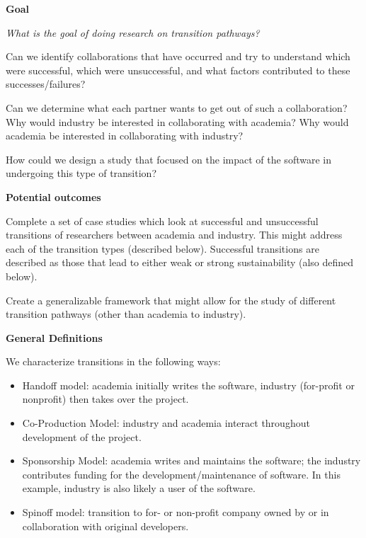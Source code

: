 
\textbf{Goal}

\emph{What is the goal of doing research on transition pathways?} 

Can we identify collaborations that have occurred and try to understand which were successful, which were unsuccessful, and what factors contributed to these successes/failures? 

Can we determine what each partner wants to get out of such a collaboration?
Why would industry be interested in collaborating with academia? 
Why would academia be interested in collaborating with industry?

How could we design a study that focused on the impact of the software in
undergoing this type of transition?

\textbf{Potential outcomes}

Complete a set of case studies which look at successful and unsuccessful
transitions of researchers between academia and industry. This might address 
each of the transition types (described below). Successful transitions are
described as those that lead to either weak or strong sustainability (also
defined below).

Create a generalizable framework that might allow for the study of different
transition pathways (other than academia to industry).

\textbf{General Definitions}

We characterize transitions in the following ways:
\begin{itemize}

\item Handoff model: academia initially writes the software, industry (for-profit 
or nonprofit) then takes over the project.

\item Co-Production Model: industry and academia interact throughout development
of the project.

\item Sponsorship Model: academia writes and maintains the software; the
industry contributes funding for the development\slash maintenance of software.
In this example, industry is also likely a user of the software.

\item Spinoff model: transition to for- or non-profit company owned by or in
collaboration with original developers.

\end{itemize}

